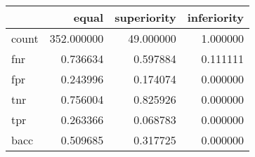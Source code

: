\begin{tabular}{lrrr}
\toprule
{} &       equal &  superiority &  inferiority \\
\midrule
count &  352.000000 &    49.000000 &     1.000000 \\
fnr   &    0.736634 &     0.597884 &     0.111111 \\
fpr   &    0.243996 &     0.174074 &     0.000000 \\
tnr   &    0.756004 &     0.825926 &     0.000000 \\
tpr   &    0.263366 &     0.068783 &     0.000000 \\
bacc  &    0.509685 &     0.317725 &     0.000000 \\
\bottomrule
\end{tabular}
